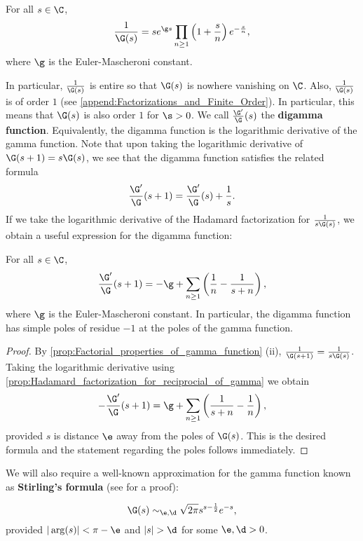     \begin{proposition}\label{prop:Hadamard_factorization_for_reciprocial_of_gamma}
      For all $s \in \C$,
      \[
        \frac{1}{\G(s)} = se^{\g s}\prod_{n \ge 1}\left(1+\frac{s}{n}\right)e^{-\frac{s}{n}},
      \]
      where $\g$ is the Euler-Mascheroni constant.
    \end{proposition}

    In particular, $\frac{1}{\G(s)}$ is entire so that $\G(s)$ is nowhere vanishing on $\C$. Also, $\frac{1}{\G(s)}$ is of order $1$ (see \cref{append:Factorizations_and_Finite_Order}). In particular, this means that $\G(s)$ is also order $1$ for $\s > 0$. We call $\frac{\G'}{\G}(s)$ the \textbf{digamma function}. Equivalently, the digamma function is the logarithmic derivative of the gamma function. Note that upon taking the logarithmic derivative of $\G(s+1) = s\G(s)$, we see that the digamma function satisfies the related formula
    \[
      \frac{\G'}{\G}(s+1) = \frac{\G'}{\G}(s)+\frac{1}{s}.
    \]
    If we take the logarithmic derivative of the Hadamard factorization for $\frac{1}{s\G(s)}$, we obtain a useful expression for the digamma function:

    \begin{corollary}\label{cor:logarithmic_derivative_of_gamma}
      For all $s \in \C$,
      \[
        \frac{\G'}{\G}(s+1) = -\g+\sum_{n \ge 1}\left(\frac{1}{n}-\frac{1}{s+n}\right),
      \]
      where $\g$ is the Euler-Mascheroni constant. In particular, the digamma function has simple poles of residue $-1$ at the poles of the gamma function.
    \end{corollary}
    \begin{proof}
      By \cref{prop:Factorial_properties_of_gamma_function} (ii), $\frac{1}{\G(s+1)} = \frac{1}{s\G(s)}$. Taking the logarithmic derivative using \cref{prop:Hadamard_factorization_for_reciprocial_of_gamma} we obtain
      \[
        -\frac{\G'}{\G}(s+1) = \g+\sum_{n \ge 1}\left(\frac{1}{s+n}-\frac{1}{n}\right),
      \]
      provided $s$ is distance $\e$ away from the poles of $\G(s)$. This is the desired formula and the statement regarding the poles follows immediately.
    \end{proof}
    
    We will also require a well-known approximation for the gamma function known as \textbf{Stirling's formula} (see \cite{remmert1998classical} for a proof):

    \begin{theorem}
    \phantom{}
      \[
        \G(s) \sim_{\e,\d} \sqrt{2\pi}s^{s-\frac{1}{2}}e^{-s},
      \]
      provided $|\arg(s)| < \pi-\e$ and $|s| > \d$ for some $\e,\d > 0$.
    \end{theorem}

